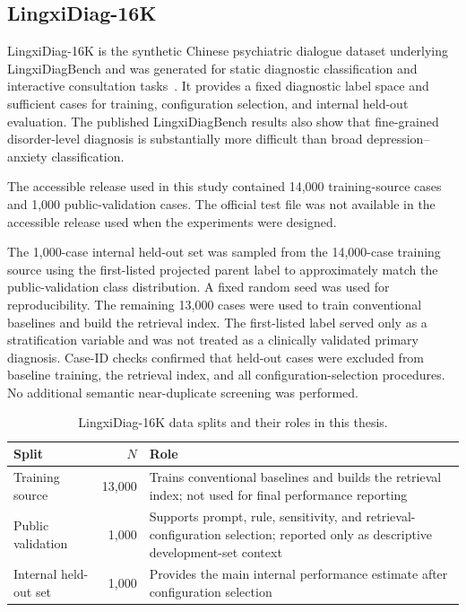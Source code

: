 \documentclass[12pt,a4paper,oneside]{report}
\begin{document}
\subsection{LingxiDiag-16K}

LingxiDiag-16K is the synthetic Chinese psychiatric dialogue dataset underlying LingxiDiagBench and was generated for static diagnostic classification and interactive consultation tasks~\citep{xu2026lingxidiagbench}. It provides a fixed diagnostic label space and sufficient cases for training, configuration selection, and internal held-out evaluation. The published LingxiDiagBench results also show that fine-grained disorder-level diagnosis is substantially more difficult than broad depression--anxiety classification.

The accessible release used in this study contained 14,000 training-source cases and 1,000 public-validation cases. The official test file was not available in the accessible release used when the experiments were designed.

The 1,000-case internal held-out set was sampled from the 14,000-case training source using the first-listed projected parent label to approximately match the public-validation class distribution. A fixed random seed was used for reproducibility. The remaining 13,000 cases were used to train conventional baselines and build the retrieval index. The first-listed label served only as a stratification variable and was not treated as a clinically validated primary diagnosis. Case-ID checks confirmed that held-out cases were excluded from baseline training, the retrieval index, and all configuration-selection procedures. No additional semantic near-duplicate screening was performed.

\begin{table}[htbp]
\centering
\caption{LingxiDiag-16K data splits and their roles in this thesis.}
\label{tab:data-roles-rewrite}
\small
\begin{tabularx}{\textwidth}{|>{\raggedright\arraybackslash}p{3.7cm}|r|>{\raggedright\arraybackslash}X|}
\hline
Split & $N$ & Role\\
\hline
Training source & 13,000 & Trains conventional baselines and builds the retrieval index; not used for final performance reporting\\
\hline
Public validation & 1,000 & Supports prompt, rule, sensitivity, and retrieval-configuration selection; reported only as descriptive development-set context\\
\hline
Internal held-out set & 1,000 & Provides the main internal performance estimate after configuration selection\\
\hline
\end{tabularx}
\end{table}
\end{document}
